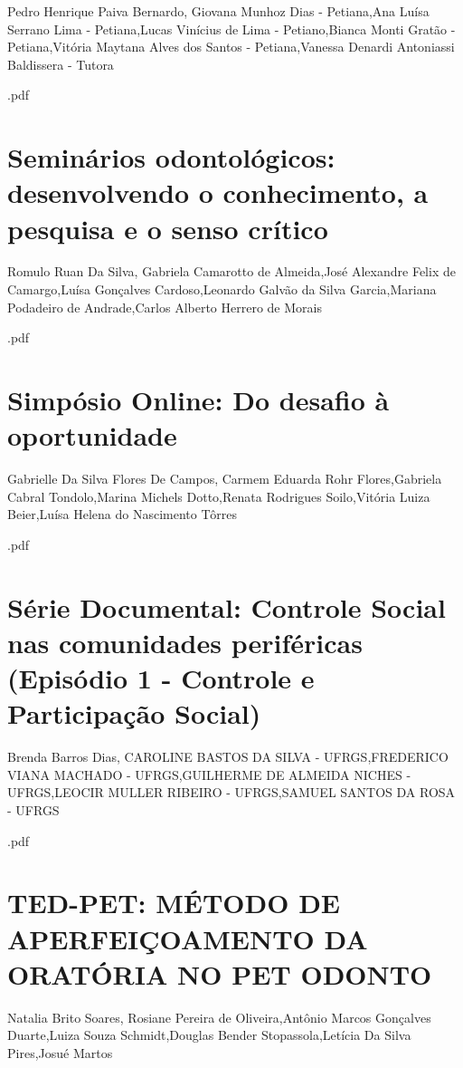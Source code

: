 Pedro Henrique Paiva Bernardo, Giovana Munhoz Dias - Petiana,Ana Luísa Serrano Lima - Petiana,Lucas Vinícius de Lima - Petiano,Bianca Monti Gratão - Petiana,Vitória Maytana Alves dos Santos - Petiana,Vanessa Denardi Antoniassi Baldissera - Tutora



.pdf\section{Seminários odontológicos: desenvolvendo o conhecimento, a pesquisa e o senso crítico}

Romulo Ruan Da Silva, Gabriela Camarotto de Almeida,José Alexandre Felix de Camargo,Luísa Gonçalves Cardoso,Leonardo Galvão da Silva Garcia,Mariana Podadeiro de Andrade,Carlos Alberto Herrero de Morais



.pdf\section{Simpósio Online: Do desafio à oportunidade}

Gabrielle Da Silva Flores De Campos, Carmem Eduarda Rohr Flores,Gabriela Cabral Tondolo,Marina Michels Dotto,Renata Rodrigues Soilo,Vitória Luiza Beier,Luísa Helena do Nascimento Tôrres



.pdf\section{Série Documental: Controle Social nas comunidades periféricas  (Episódio 1 - Controle e Participação Social)}

Brenda Barros Dias, CAROLINE BASTOS DA SILVA - UFRGS,FREDERICO VIANA MACHADO - UFRGS,GUILHERME DE ALMEIDA NICHES - UFRGS,LEOCIR MULLER RIBEIRO - UFRGS,SAMUEL SANTOS DA ROSA - UFRGS



.pdf\section{TED-PET: MÉTODO DE APERFEIÇOAMENTO DA ORATÓRIA NO PET ODONTO}

Natalia Brito Soares, Rosiane Pereira de Oliveira,Antônio Marcos Gonçalves Duarte,Luiza Souza  Schmidt,Douglas Bender Stopassola,Letícia Da Silva Pires,Josué Martos

